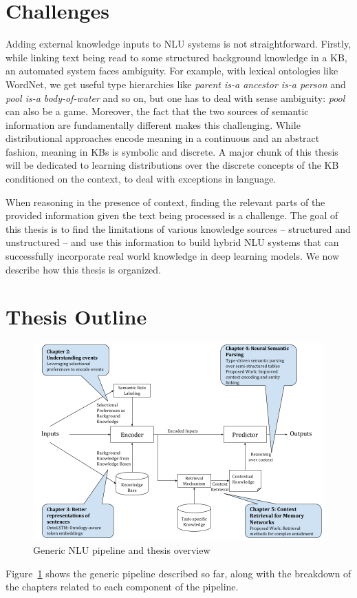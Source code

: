 \section{Challenges}
Adding external knowledge inputs to NLU systems is not straightforward.  Firstly, while linking text being read to some structured background knowledge
in a KB, an automated system faces ambiguity. For example, with lexical ontologies like WordNet, 
we get useful type hierarchies like \textit{parent is-a ancestor is-a person} and \textit{pool is-a body-of-water} 
and so on, but one has to deal with sense ambiguity: \textit{pool} can also be a game. Moreover, the fact that the two sources of semantic information are fundamentally different 
makes this challenging. While distributional approaches encode meaning in a
continuous and an abstract fashion, meaning in KBs is symbolic and discrete. A major chunk of this thesis will be dedicated to learning 
distributions over the discrete concepts of the KB conditioned on the context, to deal with exceptions in language.

When reasoning in the presence of context, finding the 
relevant parts of the provided information given the text being processed is a challenge. 
The goal of this thesis is to find the limitations of various knowledge sources -- structured and unstructured -- and use this information 
to build hybrid NLU systems that can successfully incorporate real world knowledge in deep learning models. We now describe how this thesis is organized.

\section{Thesis Outline}
\begin{figure}
\begin{center}
\includegraphics[width=6.5in]{figures/thesis_overview.png}
\caption{Generic NLU pipeline and thesis overview}
\label{fig:thesis_overview}
\end{center}
\end{figure}
Figure~\ref{fig:thesis_overview} shows the generic pipeline described so far, along with the breakdown of the chapters related to each component
of the pipeline.

